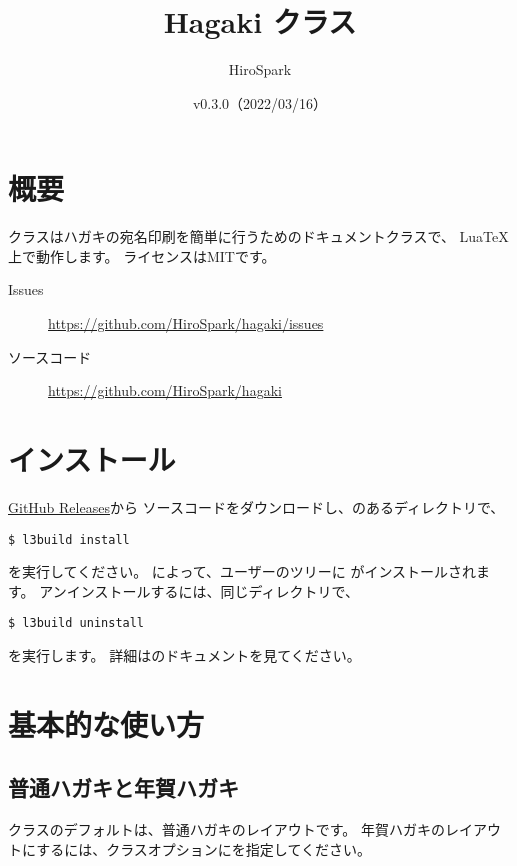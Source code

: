\documentclass{hagaki-doc}
\title{Hagaki クラス}
\author{HiroSpark}
\date{v0.3.0（2022/03/16）}
\begin{document}
\maketitle

\section{概要}

クラスはハガキの宛名印刷を簡単に行うためのドキュメントクラスで、
Lua\TeX{}上で動作します。
ライセンスはMITです。

\begin{description}
  \item[Issues] \url{https://github.com/HiroSpark/hagaki/issues}
  \item[ソースコード] \url{https://github.com/HiroSpark/hagaki}
\end{description}

\section{インストール}

\href{https://github.com/HiroSpark/hagaki/releases/}{GitHub Releases}から
ソースコードをダウンロードし、のあるディレクトリで、

\begin{lstlisting}
$ l3build install
\end{lstlisting}

を実行してください。
によって、ユーザーのツリーに
がインストールされます。
アンインストールするには、同じディレクトリで、

\begin{lstlisting}
$ l3build uninstall
\end{lstlisting}

を実行します。
詳細はのドキュメントを見てください。

\section{基本的な使い方}

\subsection{普通ハガキと年賀ハガキ}

クラスのデフォルトは、普通ハガキのレイアウトです。
年賀ハガキのレイアウトにするには、クラスオプションにを指定してください。
\end{document}
